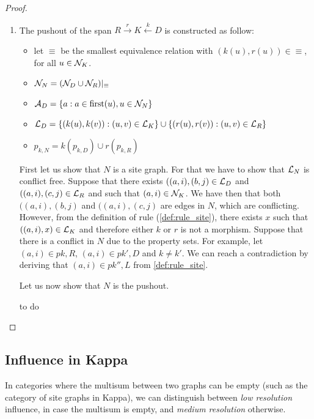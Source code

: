 \begin{proof}
\begin{enumerate}
  \item The pushout of the span $R\overset{r}{\rightarrow}K\overset{k}{\leftarrow} D$ is constructed as follow:
    \begin{itemize}
    \item let $\equiv$ be the smallest equivalence relation with $(k(u),r(u))\in\equiv$, for all $u\in\mathcal{N}_K$.
    \item $\mathcal{N}_N = (\mathcal{N}_D\cup \mathcal{N}_R)|_{\equiv}$
    \item $\mathcal{A}_D = \{a: a\in \text{first}(u), u\in\mathcal{N}_N\}$
    \item $\mathcal{L}_D = \{(k(u),k(v)) : (u,v)\in\mathcal{L}_K\}\cup\{(r(u),r(v)) : (u,v)\in\mathcal{L}_R\}$
    \item $p_{k,N} = k(p_{k,D}) \cup r(p_{k,R})$
    \end{itemize}
    First let us show that $N$ is a site graph. For that we have to show that $\mathcal{L}_N$ is conflict free. Suppose that there exists $((a,i),(b,j)\in \mathcal{L}_D$ and $((a,i),(c,j)\in \mathcal{L}_R$ and such that $(a,i)\in\mathcal{N}_K$. We have then that both $((a,i),(b,j)$ and $((a,i),(c,j)$ are edges in $N$, which are conflicting. However, from the definition of rule (\autoref{def:rule_site}), there exists $x$ such that $((a,i),x)\in\mathcal{L}_K$ and therefore either $k$ or $r$ is not a morphism.
%
    Suppose that there is a conflict in $N$ due to the property sets. For example, let $(a,i)\in p{k,R}$, $(a,i)\in p{k',D}$ and $k\neq k'$. We can reach a contradiction by deriving that $(a,i)\in p{k'',L}$ from \autoref{def:rule_site}.

    Let us now show that $N$ is the pushout.
  \begin{mdframed}[backgroundcolor=blue!20]
    to do
  \end{mdframed}
 \end{enumerate}
 \end{proof}

\subsection{Influence in Kappa}
  In categories where the multisum between two graphs can be empty (such as the category of site graphs in Kappa), we can distinguish between \emph{low resolution} influence, in case the multisum is empty, and \emph{medium resolution} otherwise.

